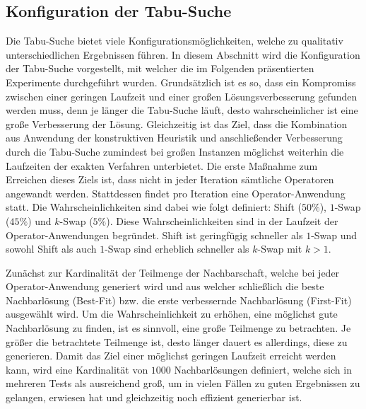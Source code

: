 \vfill
\pagebreak

\subsection{Konfiguration der Tabu-Suche}
\label{sec:tabu_search_config}

Die Tabu-Suche bietet viele Konfigurationsmöglichkeiten, welche zu qualitativ unterschiedlichen
Ergebnissen führen. In diesem Abschnitt wird die Konfiguration der Tabu-Suche vorgestellt,
mit welcher die im Folgenden präsentierten Experimente durchgeführt wurden.
Grundsätzlich ist es so, dass ein Kompromiss zwischen einer geringen Laufzeit und einer großen Lösungsverbesserung
gefunden werden muss, denn je länger die Tabu-Suche läuft, desto wahrscheinlicher ist eine große Verbesserung
der Lösung. Gleichzeitig ist das Ziel, dass die Kombination aus Anwendung der konstruktiven Heuristik und anschließender Verbesserung durch die Tabu-Suche zumindest bei großen Instanzen möglichst weiterhin die Laufzeiten der exakten Verfahren unterbietet. Die erste Maßnahme zum Erreichen dieses Ziels ist, dass nicht in jeder Iteration sämtliche Operatoren angewandt werden. Stattdessen findet pro Iteration eine Operator-Anwendung statt. Die Wahrscheinlichkeiten sind dabei wie folgt definiert: Shift ($50 \%$), $1$-Swap ($45 \%$) und $k$-Swap ($5 \%$). Diese Wahrscheinlichkeiten sind in der Laufzeit der Operator-Anwendungen begründet. Shift ist geringfügig schneller als $1$-Swap und sowohl Shift
als auch $1$-Swap sind erheblich schneller als $k$-Swap mit $k > 1$.

Zunächst zur Kardinalität der Teilmenge der Nachbarschaft, welche bei jeder Operator-Anwendung generiert wird
und aus welcher schließlich die beste Nachbarlösung (Best-Fit) bzw. die erste verbessernde Nachbarlösung (First-Fit)
ausgewählt wird. Um die Wahrscheinlichkeit zu erhöhen, eine möglichst gute Nachbarlösung zu finden, ist es sinnvoll, eine
große Teilmenge zu betrachten. Je größer die betrachtete Teilmenge ist, desto länger dauert es allerdings,
diese zu generieren. Damit das Ziel einer möglichst geringen Laufzeit erreicht werden kann, wird eine Kardinalität
von $1000$ Nachbarlösungen definiert, welche sich in mehreren Tests als ausreichend groß, um in vielen Fällen zu guten
Ergebnissen zu gelangen, erwiesen hat und gleichzeitig noch effizient generierbar ist.

